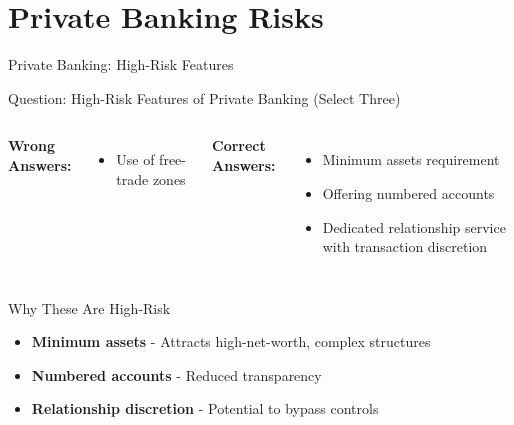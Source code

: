 \documentclass{beamer}
\begin{document}
\section{Private Banking Risks}
\begin{frame}{Private Banking: High-Risk Features}
\begin{block}{Question: High-Risk Features of Private Banking (Select Three)}
\end{block}

\begin{columns}
\textcolor{wrong}{\textbf{ Wrong Answers:}}
\begin{itemize}
    \item Use of free-trade zones
\end{itemize}

\textcolor{correct}{\textbf{Correct Answers:}}
\begin{itemize}
    \item Minimum assets requirement
    \item Offering numbered accounts
    \item Dedicated relationship service with transaction discretion
\end{itemize}
\end{columns}

\vspace{0.3cm}
\begin{block}{Why These Are High-Risk}
\begin{itemize}
    \item \textbf{Minimum assets} - Attracts high-net-worth, complex structures
    \item \textbf{Numbered accounts} - Reduced transparency
    \item \textbf{Relationship discretion} - Potential to bypass controls
\end{itemize}
\end{block}
\end{frame}
\end{document}
